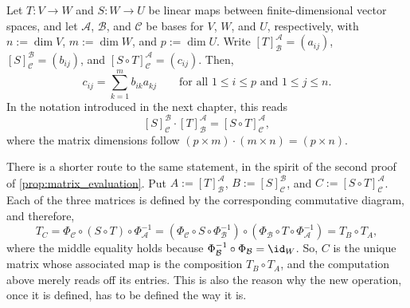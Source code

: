 \begin{proposition*}
\label{prop:representation_matrix_of_composition}
Let $T: V \to W$ and $S: W \to U$ be linear maps between finite-di\-men\-sional vector spaces, and let $\mathcal{A}$, $\mathcal{B}$, and $\mathcal{C}$ be bases for $V$, $W$, and $U$, respectively, with $n := \dim V$, $m := \dim W$, and $p := \dim U$. Write $[T]_{\mathcal{B}}^{\mathcal{A}} = (a_{ij})$, $[S]_{\mathcal{C}}^{\mathcal{B}} = (b_{ij})$, and $[S \circ T]_{\mathcal{C}}^{\mathcal{A}} = (c_{ij})$. Then,
\[
c_{ij} = \sum_{k=1}^m b_{ik} a_{kj} \qquad \text{for all } 1 \le i \le p \text{ and } 1 \le j \le n.
\]
In the notation introduced in the next chapter, this reads
\[
[S]_{\mathcal{C}}^{\mathcal{B}} \cdot [T]_{\mathcal{B}}^{\mathcal{A}} = [S \circ T]_{\mathcal{C}}^{\mathcal{A}},
\]
where the matrix dimensions follow $(p \times m) \cdot (m \times n) = (p \times n)$.
\end{proposition*}

\begin{remark}
There is a shorter route to the same statement, in the spirit of the second proof of \cref{prop:matrix_evaluation}. Put $A := [T]_{\mathcal{B}}^{\mathcal{A}}$, $B := [S]_{\mathcal{C}}^{\mathcal{B}}$, and $C := [S \circ T]_{\mathcal{C}}^{\mathcal{A}}$. Each of the three matrices is defined by the corresponding commutative diagram, and therefore,
\[
T_C = \Phi_{\mathcal{C}} \circ (S \circ T) \circ \Phi_{\mathcal{A}}^{-1} = \left( \Phi_{\mathcal{C}} \circ S \circ \Phi_{\mathcal{B}}^{-1} \right) \circ \left( \Phi_{\mathcal{B}} \circ T \circ \Phi_{\mathcal{A}}^{-1} \right) = T_B \circ T_A,
\]
where the middle equality holds because $\Phi_{\mathcal{B}}^{-1} \circ \Phi_{\mathcal{B}} = \id_W$. So, $C$ is the unique matrix whose associated map is the composition $T_B \circ T_A$, and the computation above merely reads off its entries. This is also the reason why the new operation, once it is defined, has to be defined the way it is.
\end{remark}

